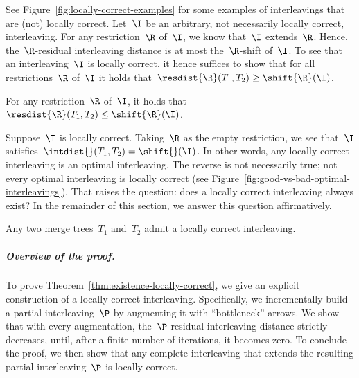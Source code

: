 %
\noindent
See Figure~\ref{fig:locally-correct-examples} for some examples of interleavings that are (not) locally correct.
%
Let~$\I$ be an arbitrary, not necessarily locally correct, interleaving.
For any restriction~$\R$ of~$\I$, we know that~$\I$ extends~$\R$.
Hence, the~$\R$-residual interleaving distance is at most the~$\R$-shift of~$\I$.
To see that an interleaving~$\I$ is locally correct, it hence suffices to show that for all restrictions~$\R$ of~$\I$ it holds that~$\resdist{\R}(T_1, T_2) \ge \shift{\R}(\I)$.
%
\begin{observation}\label{obs:locally-correct}
	For any restriction~$\R$ of~$\I$, it holds that~$\resdist{\R}(T_1, T_2) \le \shift{\R}(\I)$.
\end{observation}
%
\noindent
Suppose~$\I$ is locally correct.
Taking~$\R$ as the empty restriction, we see that~$\I$ satisfies~$\intdist{}(T_1, T_2) = \shift{}(\I)$.
In other words, any locally correct interleaving is an optimal interleaving.
The reverse is not necessarily true; not every optimal interleaving is locally correct (see Figure~\ref{fig:good-vs-bad-optimal-interleavings}).
That raises the question: does a locally correct interleaving always exist?
In the remainder of this section, we answer this question affirmatively.
%
\begin{theorem}\label{thm:existence-locally-correct}
	Any two merge trees~$T_1$ and~$T_2$ admit a locally correct interleaving.
\end{theorem}
%
\subparagraph{Overview of the proof.}
To prove Theorem~\ref{thm:existence-locally-correct}, we give an explicit construction of a locally correct interleaving.
Specifically, we incrementally build a partial interleaving~$\P$ by augmenting it with ``bottleneck'' arrows.
We show that with every augmentation, the~$\P$-residual interleaving distance strictly decreases, until, after a finite number of iterations, it becomes zero.
To conclude the proof, we then show that any complete interleaving that extends the resulting partial interleaving~$\P$ is locally correct.
%
